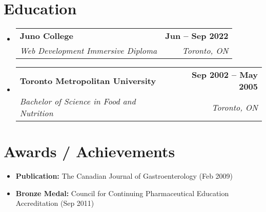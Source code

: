 \documentclass[letterpaper,11pt]{article}
\makeatletter
\newcommand{\resumeSubheading}[4]{
  \vspace{-2pt}\item
    \begin{tabular*}{1.0\textwidth}[t]{l@{\extracolsep{\fill}}r}
      \textbf{#1} & \textbf{\small #2} \\
      \textit{\small#3} & \textit{\small #4} \\
    \end{tabular*}\vspace{-7pt}
}
\newcommand{\resumeSubHeadingListStart}{\begin{itemize}[leftmargin=0.0in, label={}]}
\newcommand{\resumeSubHeadingListEnd}{\end{itemize}}
\makeatother
\begin{document}
\section{Education}
\resumeSubHeadingListStart
    \resumeSubheading
      {Juno College}{Jun -- Sep 2022}
      {Web Development Immersive Diploma}{Toronto, ON}
    \resumeSubheading
      {Toronto Metropolitan University}{Sep 2002 -- May 2005}
      {Bachelor of Science in Food and Nutrition}{Toronto, ON}
  \resumeSubHeadingListEnd


\section{Awards / Achievements}

\begin{itemize}
\item \textbf{Publication:} The Canadian Journal of Gastroenterology (Feb 2009)
\item \textbf{Bronze Medal:} Council for Continuing Pharmaceutical Education Accreditation (Sep 2011)
\end{itemize}
\end{document}
